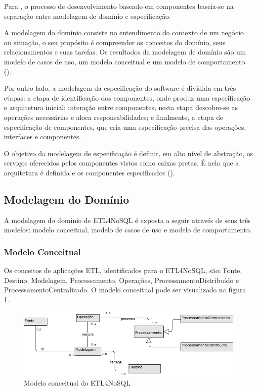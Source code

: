 Para \cite{cheesman:2001}, o processo de desenvolvimento baseado em componentes baseia-se na separação entre modelagem de domínio e especificação.

A modelagem do domínio consiste no entendimento do contexto de um negócio ou situação, o seu propósito é compreender os conceitos do domínio, seus relacionamentos e suas tarefas. Os resultados da modelagem de domínio são um modelo de casos de uso, um modelo conceitual e um modelo de comportamento (\cite{itana:2005}).

Por outro lado, a modelagem da especificação do software é dividida em três etapas: a etapa de identificação dos componentes, onde produz uma especificação e arquitetura inicial; interação entre componentes, nesta etapa descobre-se as operações necessárias e aloca responsabilidades; e finalmente, a etapa de especificação de componentes, que cria uma especificação precisa das operações, interfaces e componentes.  

O objetivo da modelagem de especificação é definir, em alto nível de abstração, os serviços oferecidos pelos componentes vistos como caixas pretas. É nela que a arquitetura é definida e os componentes especificados (\cite{itana:2005}).

\subsection{Modelagem do Domínio}

A modelagem do domínio de ETL4NoSQL é exposta a seguir através de seus três modelos: modelo conceitual, modelo de casos de uso e modelo de comportamento.

\subsubsection{Modelo Conceitual}

Os conceitos de aplicações ETL, identificados para o ETL4NoSQL, são: Fonte, Destino, Modelagem, Processamento, Operações, ProcessamentoDistribuído e ProcessamentoCentralizado. O modelo conceitual pode ser visualizado na figura \ref{modeloconceitual}.

\begin{figure}[h]
	\centering
	\includegraphics[scale=0.5]{fig/modeloconceitual.png}
	\caption{Modelo conceitual do ETL4NoSQL}
	\label{modeloconceitual}
\end{figure}

